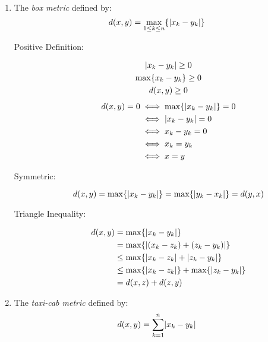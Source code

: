\documentclass[letterpaper,12pt,fleqn]{article}
\begin{document}
\begin{examples}
\begin{enumerate}
  \item The \emph{box metric} defined by:
    \[d(x,y)=\max_{1\le k\le n}\{\lvert x_k-y_k\rvert\}\]

    \begin{description}
    \item[Positive Definition:]
      \begin{gather*}
        \lvert x_k-y_k\rvert\ge0 \\
        \max\{x_k-y_k\}\ge0 \\
        d(x,y)\ge0
      \end{gather*}
      \begin{align*}
        d(x,y)=0 &\iff \max\{\lvert x_k-y_k\rvert\}=0 \\
        &\iff \lvert x_k-y_k\rvert=0 \\
        &\iff x_k-y_k=0 \\
        &\iff x_k=y_k \\
        &\iff x=y
      \end{align*}
    \item[Symmetric:]
      \[d(x,y)=\max\{\lvert x_k-y_k\rvert\}=\max\{\lvert y_k-x_k\rvert\}=d(y,x)\]
    \item[Triangle Inequality:]
      \begin{align*}
        d(x,y) &= \max\{\lvert x_k-y_k\rvert\} \\
        &= \max\{\lvert(x_k-z_k)+(z_k-y_k)\rvert\} \\
        &\le \max\{\lvert x_k-z_k\rvert+\lvert z_k-y_k\rvert\} \\
        &\le \max\{\lvert x_k-z_k\rvert\}+\max\{\lvert z_k-y_k\rvert\} \\
        &= d(x,z)+d(z,y)
      \end{align*}
    \end{description}

  \item The \emph{taxi-cab metric} defined by:
    \[d(x,y)=\sum_{k=1}^n\lvert x_k-y_k\rvert\]


\end{enumerate}
\end{examples}
\end{document}
